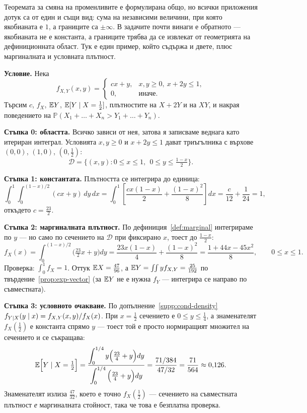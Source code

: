 \begin{supp}
Теоремата за смяна\label{supp:joint-worked} на променливите е формулирана общо, но всички
приложения дотук са от един и същи вид: сума на независими величини, при която якобианата е
$1$, а границите са $\pm\infty$. В задачите почти винаги е обратното — якобианата не е
константа, а границите трябва да се извлекат от геометрията на дефиниционната област. Тук е
един пример, който съдържа и двете, плюс маргиналната и условната плътност.

\textbf{Условие.} Нека
\[
f_{X,Y}(x,y) = \begin{cases} cx+y, & x,y \ge 0,\ x+2y \le 1,\\ 0, & \text{иначе.}\end{cases}
\]
Търсим $c$, $f_X$, $\mathbb{E} Y$, $\mathbb{E}[Y \mid X = \tfrac12]$, плътностите на $X+2Y$ и на $XY$, и
накрая поведението на $\mathbb{P}(X_1+\dots+X_n > Y_1+\dots+Y_n)$.

\textbf{Стъпка 0: областта.} Всичко зависи от нея, затова я записваме веднага като
итериран интеграл. Условията $x,y \ge 0$ и $x+2y \le 1$ дават триъгълника с върхове
$(0,0)$, $(1,0)$, $(0,\tfrac12)$:
\[
\mathcal{D} = \Big\{ (x,y) : 0 \le x \le 1,\ \ 0 \le y \le \tfrac{1-x}{2} \Big\} .
\]

\textbf{Стъпка 1: константата.} Плътността се интегрира до единица:
\[
\int_0^1 \!\! \int_0^{(1-x)/2} (cx+y)\,dy\,dx
= \int_0^1 \left[ \frac{cx(1-x)}{2} + \frac{(1-x)^2}{8} \right] dx
= \frac{c}{12} + \frac{1}{24} = 1 ,
\]
откъдето $c = \frac{23}{2}$.

\textbf{Стъпка 2: маргиналната плътност.} По дефиниция~\ref{def:marginal} интегрираме по
$y$ — но само по сечението на $\mathcal{D}$ при фиксирано $x$, тоест до $\frac{1-x}{2}$:
\[
f_X(x) = \int_0^{(1-x)/2}\!\Big(\tfrac{23}{2}x+y\Big) dy
= \frac{23x(1-x)}{4} + \frac{(1-x)^2}{8}
= \frac{1+44x-45x^2}{8}, \qquad 0 \le x \le 1 .
\]
Проверка: $\int_0^1 f_X = 1$. Оттук $\mathbb{E} X = \frac{47}{96}$, а
$\mathbb{E} Y = \iint y f_{X,Y} = \frac{25}{192}$ по твърдение~\ref{prop:exp-vector} (за $\mathbb{E} Y$ не е
нужна $f_Y$ — интегрира се направо по съвместната).

\textbf{Стъпка 3: условното очакване.} По допълнение~\ref{supp:cond-density}
$f_{Y \mid X}(y \mid x) = f_{X,Y}(x,y)/f_X(x)$. При $x = \frac12$ сечението е
$0 \le y \le \frac14$, а знаменателят $f_X(\frac12)$ е константа спрямо $y$ — тоест той е
просто нормиращият множител на сечението и се съкращава:
\[
\mathbb{E}\Big[Y \mid X = \tfrac12\Big]
= \frac{\displaystyle\int_0^{1/4} y\Big(\tfrac{23}{4}+y\Big)dy}
       {\displaystyle\int_0^{1/4} \Big(\tfrac{23}{4}+y\Big)dy}
= \frac{71/384}{47/32} = \frac{71}{564} \approx 0{,}126 .
\]
Знаменателят излиза $\frac{47}{32}$, което е точно $f_X(\frac12)$ — сечението на съвместната
плътност \emph{е} маргиналната стойност, така че това е безплатна проверка.


\end{supp}
